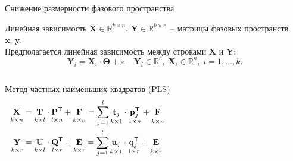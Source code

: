 \documentclass[9pt]{beamer}
\newcommand{\bx}{\mathbf{x}}
\newcommand{\by}{\mathbf{y}}
\newcommand{\bY}{\mathbf{Y}}
\newcommand{\bX}{\mathbf{X}}
\newcommand{\bu}{\mathbf{u}}
\newcommand{\bt}{\mathbf{t}}
\newcommand{\bp}{\mathbf{p}}
\newcommand{\bq}{\mathbf{q}}
\newcommand{\bP}{\mathbf{P}}
\newcommand{\bT}{\mathbf{T}}
\newcommand{\bQ}{\mathbf{Q}}
\newcommand{\bE}{\mathbf{E}}
\newcommand{\bF}{\mathbf{F}}
\newcommand{\bU}{\mathbf{U}}
\newcommand{\bbR}{\mathbb{R}}
\newcommand{\T}{\mathsf{T}}
\begin{document}
\begin{frame}{Снижение размерности фазового пространства}


\begin{block}{Линейная зависимость}
\vspace{0.1cm}
	$\bX\in\bbR^{k\times n},\, \bY\in\bbR^{k\times r}$~-- матрицы фазовых пространств $\bx,\,\by$.\\
	Предполагается линейная зависимость между строками $\bX$ и $\bY$:
	\[
	    \mathbf{Y}_i = \mathbf{X}_i\cdot\mathbf{\Theta} + \boldsymbol{\varepsilon} \quad \mathbf{Y}_i\in\bbR^r,\;\mathbf{X}_i\in\bbR^n,\; i = 1,\ldots,k.
	\]
\end{block}
\vspace{-0.3cm}
\begin{columns}
\begin{block}{Метод частных наименьших квадратов (PLS)}
	\vspace{-0.5cm}
\begin{align*}
\underset{k \times n}{\vphantom{\bQ}\bX} 
&= \underset{k \times l}{\vphantom{\bQ}\bT} \cdot \underset{l \times n}{\vphantom{\bQ}\bP^{\T}} + \underset{k \times n}{\vphantom{\bQ}\bF} 
= \sum_{j=1}^l \underset{k \times 1}{\vphantom{\bp_j^{\T}}\bt_j} \cdot \underset{1 \times n}{\bp_j^{\T}} + \underset{k \times n}{\vphantom{\bp_j^{\T}}\bF}\\
\underset{k \times r}{\vphantom{\bQ}\bY} 
&= \underset{k \times l}{\vphantom{\bQ}\bU} \cdot \underset{l \times r}{\bQ^{\T}} + \underset{k \times r}{\vphantom{\bQ}\bE}
=  \sum_{j=1}^l  \underset{k \times 1}{\vphantom{\bq_j^{\T}}\bu_j} \cdot \underset{1 \times r}{\bq_j^{\T}} +  \underset{k\times r}{\vphantom{\bq_j^{\T}}\bE}
\end{align*}
\end{block}


\end{columns}
\end{frame}
\end{document}
